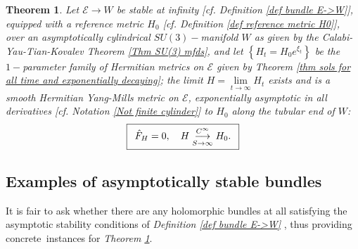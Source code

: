 \documentclass{article}
\newcommand{\tublim}{\overset{C^\infty}{\underset{S\rightarrow\infty}{\longrightarrow}}}
\newcommand{\mc}[1]{\mathcal{#1}}
\newtheorem{theorem}{Theorem}
\begin{document}
\begin{theorem}         \label{Thm MAIN THEOREM}
Let $\mc{E}\rightarrow W$ be stable at
infinity [cf. \emph{Definition \ref{def bundle E->W}}], equipped with a reference metric $H_{0}$ [cf. Definition \ref{def reference metric H0}], over an asymptotically
cylindrical $SU\left( 3\right) -$manifold $W$ as given by the
Calabi-Yau-Tian-Kovalev \emph{Theorem \ref{Thm SU(3) mfds}}, and let $\left\{
H_{t}=H_{0}e^{\xi _{t}}\right\} $ be the $1-$parameter family of Hermitian
metrics on $\mathcal{E}$ given by \emph{Theorem \ref{thm sols for all time
and exponentially decaying}}; the limit $H=\lim\limits_{t\rightarrow\infty}H_t$ exists and is a smooth Hermitian Yang-Mills metric on  $\mathcal{E}$, exponentially asymptotic  in all derivatives [cf. \emph{Notation \ref{Not finite cylinder}}] to $H_0$ along the tubular end of $W$: %
%
\begin{equation*}       \index{metric!Hermitian Yang-Mills}
\fbox{$\begin{array}{c}
        \hat{F}_{H}=0, \quad H \tublim H_0. \\
\end{array}$}
\end{equation*}
\end{theorem}

\subsection{Examples of asymptotically stable bundles}
\label{Subsec Examples of ASB}

It is fair to ask whether there are any holomorphic bundles at all satisfying
the asymptotic stability conditions of \emph{Definition \ref{def bundle E->W}%
}, thus providing concrete\emph{\ }instances for  \emph{Theorem \ref{Thm MAIN THEOREM}}. 
\end{document}
